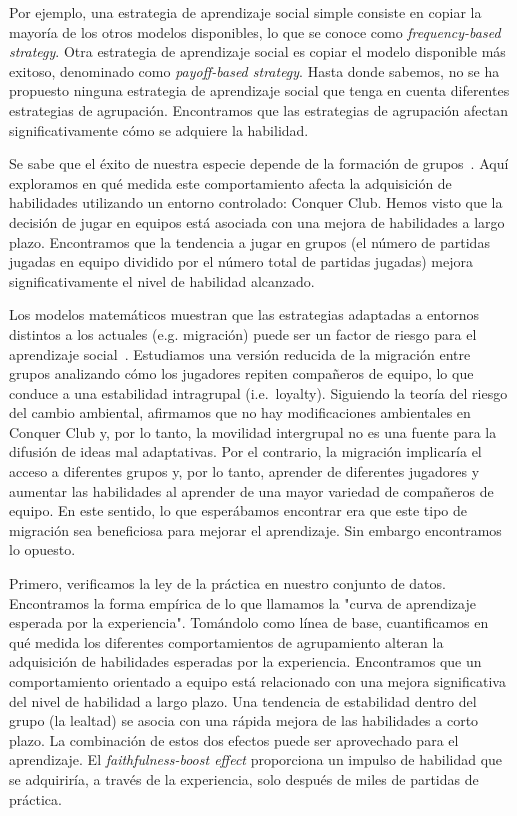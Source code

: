 \documentclass[a4paper,10pt]{book}
\theoremstyle{definition}
\begin{document}

Por ejemplo, una estrategia de aprendizaje social simple consiste en copiar la mayoría de los otros modelos disponibles, lo que se conoce como \emph{frequency-based strategy}.
%
Otra estrategia de aprendizaje social es copiar el modelo disponible más exitoso, denominado como \emph{payoff-based strategy}.
%
Hasta donde sabemos, no se ha propuesto ninguna estrategia de aprendizaje social que tenga en cuenta diferentes estrategias de agrupación.
%
Encontramos que las estrategias de agrupación afectan significativamente cómo se adquiere la habilidad.


Se sabe que el éxito de nuestra especie depende de la formación de grupos~\cite{Richerson2010,dunbar1993-coevolutionNeocorticalSizeGroupSizeAndLanguage}.
%
Aquí exploramos en qué medida este comportamiento afecta la adquisición de habilidades utilizando un entorno controlado: Conquer Club.
%
Hemos visto que la decisión de jugar en equipos está asociada con una mejora de habilidades a largo plazo.
%
Encontramos que la tendencia a jugar en grupos (el n\'umero de partidas jugadas en equipo dividido por el n\'umero total de partidas jugadas) mejora significativamente el nivel de habilidad alcanzado.


Los modelos matemáticos muestran que las estrategias adaptadas a entornos distintos a los actuales (e.g. migración) puede ser un factor de riesgo para el aprendizaje social~\cite{boyd1989-socialLearningAsAdaptation}.
%
Estudiamos una versión reducida de la migración entre grupos analizando cómo los jugadores repiten compañeros de equipo, lo que conduce a una estabilidad intragrupal (i.e.~loyalty).
%
Siguiendo la teoría del riesgo del cambio ambiental, afirmamos que no hay modificaciones ambientales en Conquer Club y, por lo tanto, la movilidad intergrupal no es una fuente para la difusión de ideas mal adaptativas.
%
Por el contrario, la migración implicaría el acceso a diferentes grupos y, por lo tanto, aprender de diferentes jugadores y aumentar las habilidades al aprender de una mayor variedad de compañeros de equipo.
%
En este sentido, lo que esperábamos encontrar era que este tipo de migración sea beneficiosa para mejorar el aprendizaje.
%
Sin embargo encontramos lo opuesto.


Primero, verificamos la ley de la práctica en nuestro conjunto de datos.
%
Encontramos la forma empírica de lo que llamamos la "curva de aprendizaje esperada por la experiencia".
%
Tomándolo como línea de base, cuantificamos en qué medida los diferentes comportamientos de agrupamiento alteran la adquisición de habilidades esperadas por la experiencia.
%
Encontramos que un comportamiento orientado a equipo está relacionado con una mejora significativa del nivel de habilidad a largo plazo.
%
Una tendencia de estabilidad dentro del grupo (la lealtad) se asocia con una rápida mejora de las habilidades a corto plazo.
%
La combinación de estos dos efectos puede ser aprovechado para el aprendizaje.
%
El \emph{faithfulness-boost effect} proporciona un impulso de habilidad que se adquiriría, a través de la experiencia, solo después de miles de partidas de práctica.
\end{document}
